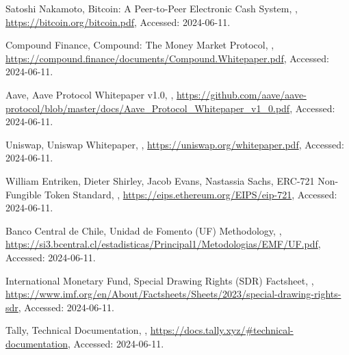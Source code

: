 \documentclass[12pt]{article}
\begin{document}
\begin{thebibliography}{1}

Satoshi Nakamoto,
\newblock Bitcoin: A Peer-to-Peer Electronic Cash System,
,
\newblock \url{https://bitcoin.org/bitcoin.pdf},
\newblock Accessed: 2024-06-11.

Compound Finance,
\newblock Compound: The Money Market Protocol,
,
\newblock \url{https://compound.finance/documents/Compound.Whitepaper.pdf},
\newblock Accessed: 2024-06-11.

Aave,
\newblock Aave Protocol Whitepaper v1.0,
,
\newblock \url{https://github.com/aave/aave-protocol/blob/master/docs/Aave_Protocol_Whitepaper_v1_0.pdf},
\newblock Accessed: 2024-06-11.

Uniswap,
\newblock Uniswap Whitepaper,
,
\newblock \url{https://uniswap.org/whitepaper.pdf},
\newblock Accessed: 2024-06-11.

William Entriken, Dieter Shirley, Jacob Evans, Nastassia Sachs,
\newblock ERC-721 Non-Fungible Token Standard,
,
\newblock \url{https://eips.ethereum.org/EIPS/eip-721},
\newblock Accessed: 2024-06-11.

Banco Central de Chile,
\newblock Unidad de Fomento (UF) Methodology,
,
\newblock \url{https://si3.bcentral.cl/estadisticas/Principal1/Metodologias/EMF/UF.pdf},
\newblock Accessed: 2024-06-11.

International Monetary Fund,
\newblock Special Drawing Rights (SDR) Factsheet,
,
\newblock \url{https://www.imf.org/en/About/Factsheets/Sheets/2023/special-drawing-rights-sdr},
\newblock Accessed: 2024-06-11.

Tally,
\newblock Technical Documentation,
,
\newblock \url{https://docs.tally.xyz/#technical-documentation},
\newblock Accessed: 2024-06-11.

\end{thebibliography}
\end{document}
